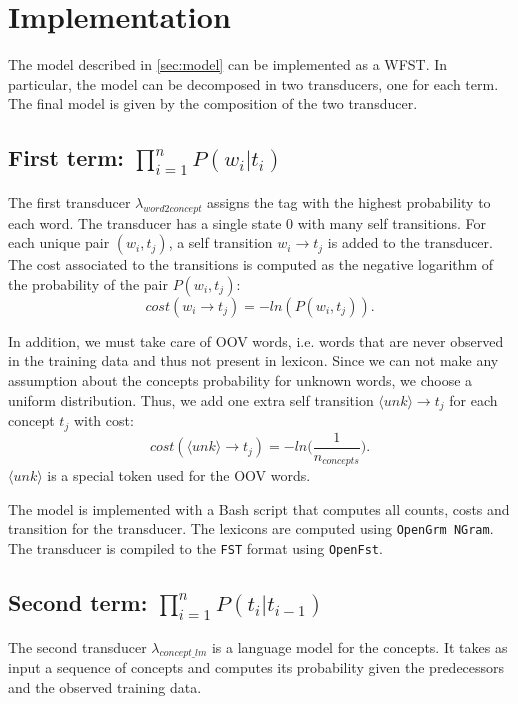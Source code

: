 \section{Implementation}
\label{sec:implementation}

The model described in \cref{sec:model} can be implemented as a \ac{WFST}.
In particular, the model can be decomposed in two transducers, one for each term.
The final model is given by the composition of the two transducer.

\subsection{First term: $\prod_{i=1}^n P(w_i | t_i)$}
The first transducer $\lambda_{word2concept}$ assigns the tag with the highest probability to each word.
The transducer has a single state $0$ with many self transitions.
For each unique pair $(w_i, t_j)$, a self transition $w_i \rightarrow t_j$ is added to the transducer.
The cost associated to the transitions is computed as the negative logarithm of the probability of the pair $P(w_i, t_j)$:
\begin{equation*}
    cost(w_i \rightarrow t_j) = -ln(P(w_i, t_j)).
\end{equation*}

In addition, we must take care of \ac{OOV} words, i.e. words that are never observed in the training data and thus not present in lexicon.
Since we can not make any assumption about the concepts probability for unknown words, we choose a uniform distribution.
Thus, we add one extra self transition $\langle unk \rangle \rightarrow t_j$ for each concept $t_j$ with cost:
\begin{equation*}
    cost(\langle unk \rangle \rightarrow t_j) = -ln \Big( \frac{1}{n_{concepts}} \Big).
\end{equation*}
$\langle unk \rangle$ is a special token used for the \ac{OOV} words.

The model is implemented with a Bash script that computes all counts, costs and transition for the transducer.
The lexicons are computed using \texttt{OpenGrm NGram}.
The transducer is compiled to the \texttt{FST} format using \texttt{OpenFst}.

\subsection{Second term: $\prod_{i=1}^n P(t_i | t_{i-1})$}
The second transducer $\lambda_{concept\_lm}$ is a language model for the concepts.
It takes as input a sequence of concepts and computes its probability given the predecessors and the observed training data.

